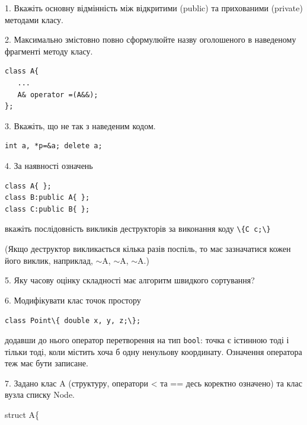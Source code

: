 \documentclass[12pt, ukrainian]{article}
\def\code#1{\Verb!#1!}
\begin{document}
{%
1. Вкажіть основну відмінність між відкритими (public) та прихованими (private) методами класу.%
\par
\vspace{2mm}
2. Максимально змістовно повно сформулюйте назву оголошеного в наведеному фрагменті методу класу.
\vspace{-3mm}
\begin{verbatim}class A{
   ...
   A& operator =(A&&);
};\end{verbatim}
\vspace{-3mm}
\par
\vspace{2mm}
3. Вкажіть, що не так з наведеним кодом.
\vspace{-3mm}
\begin{verbatim}int a, *p=&a; delete a;\end{verbatim}
\vspace{-3mm}
\par
\vspace{2mm}
4. За наявності означень
\vspace{-3mm}
\begin{verbatim}
class A{ };
class B:public A{ };
class C:public B{ };\end{verbatim}
\vspace{-3mm}
вкажіть послідовність викликів деструкторів за виконання коду \code{\{C c;\}} 

(Якщо деструктор викликається кілька разів поспіль, то має зазначатися кожен його виклик, наприклад, $\sim$A, $\sim$A, $\sim$A.)

\vspace{2mm}
5. Яку часову оцінку складності має алгоритм швидкого сортування?
\par
\vspace{2mm}
6. Модифікувати клас точок простору 

\qquad\code{class Point\{ double x, y, z;\};}


додавши до нього оператор перетворення на тип \code{bool}: точка є істинною тоді і тільки тоді, коли містить хоча б одну ненульову координату. Означення оператора теж має бути записане.%
\par
\vspace{2mm}
7. 
Задано клас A (структуру, оператори < та == десь коректно означено) та клас вузла списку Node.

struct A\{

}
\end{document}
